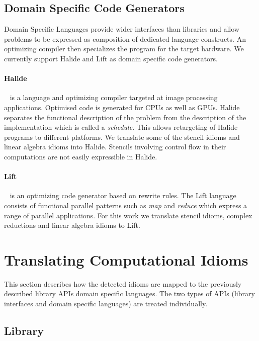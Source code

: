     \subsection{Domain Specific Code Generators}
    Domain Specific Languages provide wider interfaces than libraries and allow
    problems to be expressed as composition of dedicated language constructs.
    An optimizing compiler then specializes the program for the target hardware.
    We currently support Halide and Lift as domain specific code generators.

    \paragraph{Halide}~\cite{Ragan-Kelley2013Halide} is a language and
    optimizing compiler targeted at image processing applications.
    Optimised code is generated for CPUs as well as GPUs.
    Halide separates the functional description of the problem from the
    description of the implementation which is called a \emph{schedule}.
    This allows retargeting of Halide programs to different platforms.
    We translate some of the stencil idioms and linear algebra idioms into
    Halide.
    Stencils involving control flow in their computations are not easily
    expressible in Halide.

    \paragraph{Lift}~\cite{steuwer15rewrite, SteuwerRD17, HagedornSSGD18} is an
    optimizing code generator based on rewrite rules.
    The Lift language consists of functional parallel patterns such as
    \emph{map} and \emph{reduce} which  express a range of parallel
    applications.
    For this work we translate stencil idioms, complex reductions and linear
    algebra idioms to Lift.

\section{Translating Computational Idioms}

    This section describes how the detected idioms are mapped to the previously
    described library APIs domain specific languages.
    The two types of APIs (library interfaces and domain specific languages) are
    treated individually.

\subsection{Library}

